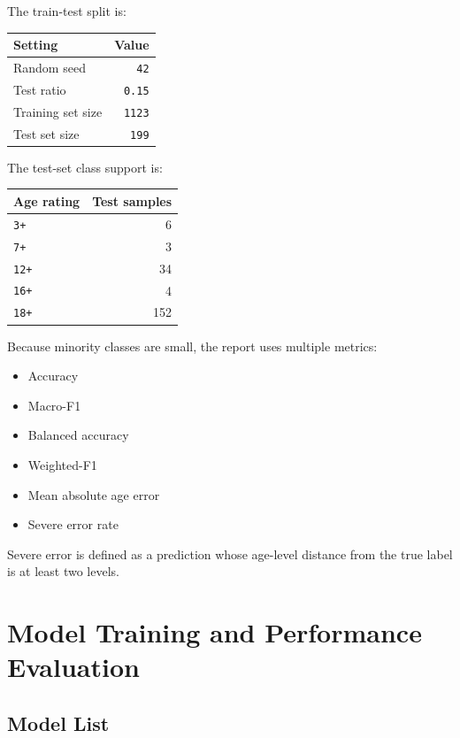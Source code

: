 \documentclass[UTF8,a4paper,12pt]{ctexart}
\newcounter{none}
\providecommand{\tightlist}{%
  \setlength{\itemsep}{0pt}\setlength{\parskip}{0pt}}
\begin{document}
The train-test split is:

{\def\LTcaptype{none} %
\begin{longtable}[]{@{}lr@{}}
\toprule\noalign{}
Setting & Value \\
\midrule\noalign{}
\endhead
\bottomrule\noalign{}
\endlastfoot
Random seed & \texttt{42} \\
Test ratio & \texttt{0.15} \\
Training set size & \texttt{1123} \\
Test set size & \texttt{199} \\
\end{longtable}
}

The test-set class support is:

{\def\LTcaptype{none} %
\begin{longtable}[]{@{}lr@{}}
\toprule\noalign{}
Age rating & Test samples \\
\midrule\noalign{}
\endhead
\bottomrule\noalign{}
\endlastfoot
\texttt{3+} & 6 \\
\texttt{7+} & 3 \\
\texttt{12+} & 34 \\
\texttt{16+} & 4 \\
\texttt{18+} & 152 \\
\end{longtable}
}

Because minority classes are small, the report uses multiple metrics:

\begin{itemize}
\tightlist
\item
  Accuracy
\item
  Macro-F1
\item
  Balanced accuracy
\item
  Weighted-F1
\item
  Mean absolute age error
\item
  Severe error rate
\end{itemize}

Severe error is defined as a prediction whose age-level distance from the true label is at least two levels.

\section{Model Training and Performance Evaluation}\label{model-training-and-performance-evaluation}

\subsection{Model List}\label{model-list}
\end{document}
